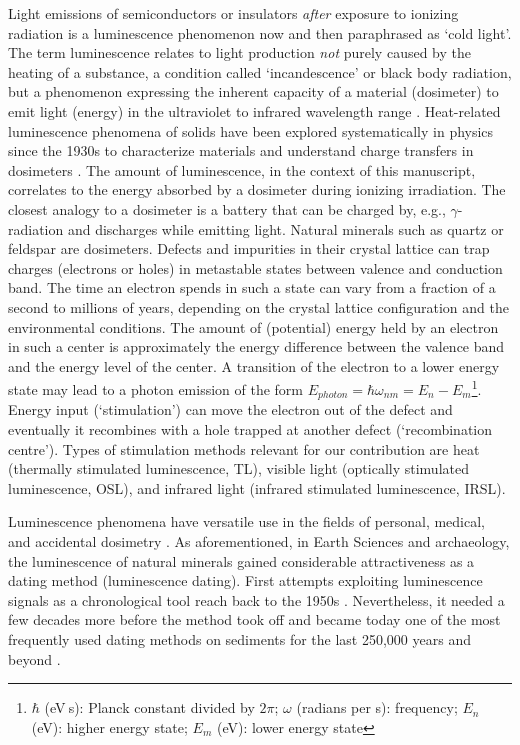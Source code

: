 Light emissions of semiconductors or insulators \emph{after} exposure to
ionizing radiation is a luminescence phenomenon now and then paraphrased
as `cold light'. The term luminescence relates to light production
\emph{not} purely caused by the heating of a substance, a condition
called `incandescence' or black body radiation, but a phenomenon
expressing the inherent capacity of a material (dosimeter) to emit light
(energy) in the ultraviolet to infrared wavelength range
\citep[e.g.,][]{Newton:1957wr, Mahesh_1989fk}. Heat-related luminescence
phenomena of solids have been explored systematically in physics since
the 1930s \citep{Urbach_1930fk} to characterize materials and understand
charge transfers in dosimeters
\citep[e.g.,][]{McKeever_1983ly, Mahesh_1989fk}. The amount of
luminescence, in the context of this manuscript, correlates to the
energy absorbed by a dosimeter during ionizing irradiation. The closest
analogy to a dosimeter is a battery that can be charged by, e.g.,
\(\gamma\)-radiation and discharges while emitting light. Natural
minerals such as quartz or feldspar are dosimeters. Defects and
impurities in their crystal lattice can trap charges (electrons or
holes) in metastable states between valence and conduction band. The
time an electron spends in such a state can vary from a fraction of a
second to millions of years, depending on the crystal lattice
configuration and the environmental conditions. The amount of
(potential) energy held by an electron in such a center is approximately
the energy difference between the valence band and the energy level of
the center. A transition of the electron to a lower energy state may
lead to a photon emission of the form
\(E_{photon} = \hbar\omega_{nm} = E_{n} - E_{m}\)\footnote{$\hbar$ (eV$~$s): Planck constant divided by $2\pi$; $\omega$ (radians per s): frequency; $E_{n}$ (eV): higher energy state; $E_{m}$ (eV): lower energy state}.
Energy input (`stimulation') can move the electron out of the defect and
eventually it recombines with a hole trapped at another defect
(`recombination centre'). Types of stimulation methods relevant for our
contribution are heat (thermally stimulated luminescence, TL), visible
light (optically stimulated luminescence, OSL), and infrared light
(infrared stimulated luminescence, IRSL).

Luminescence phenomena have versatile use in the fields of personal,
medical, and accidental dosimetry \citep[e.g.,][]{Yukihara_2011zr}. As
aforementioned, in Earth Sciences and archaeology, the luminescence of
natural minerals gained considerable attractiveness as a dating method
(luminescence dating). First attempts exploiting luminescence signals as
a chronological tool reach back to the 1950s
\citep{Daniels:1953hw, Houtermans:1957vu, Grogler_1958fk}. Nevertheless,
it needed a few decades more before the method took off and became today
one of the most frequently used dating methods on sediments for the last
250,000 years and beyond
\citep[e.g.,][]{Aitken_1985dq, Aitken_1998eu, Bateman:2019wy}.

